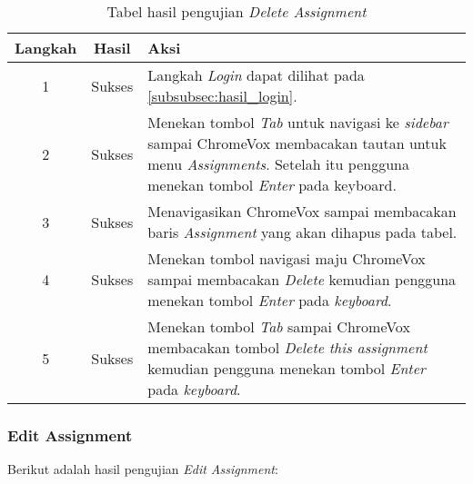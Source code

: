 \begin{table}[H]
	\centering
	\caption{Tabel hasil pengujian \textit{Delete Assignment}}
	\label{tab:hasil_delete_assignment}
	\begin{tabular}{|c|c|p{12cm}|}
		\toprule
		Langkah & Hasil & Aksi\\
		\midrule
		1 & Sukses & Langkah \textit{Login} dapat dilihat pada \ref{subsubsec:hasil_login}.\\
		2 & Sukses & Menekan tombol \textit{Tab} untuk navigasi ke \textit{sidebar} sampai ChromeVox membacakan tautan untuk menu \textit{Assignments}. Setelah itu pengguna menekan tombol \textit{Enter} pada keyboard.\\
		3 & Sukses & Menavigasikan ChromeVox sampai membacakan baris \textit{Assignment} yang akan dihapus pada tabel.\\
		4 & Sukses & Menekan tombol navigasi maju ChromeVox sampai membacakan \textit{Delete} kemudian pengguna menekan tombol \textit{Enter} pada \textit{keyboard}.\\
		5 & Sukses & Menekan tombol \textit{Tab} sampai ChromeVox membacakan tombol \textit{Delete this assignment} kemudian pengguna menekan tombol \textit{Enter} pada \textit{keyboard}.\\
		\bottomrule
	\end{tabular}
\end{table}

\subsubsection{Edit Assignment}
\label{subsubsec:hasil_edit_assignment}
Berikut adalah hasil pengujian \textit{Edit Assignment}:


